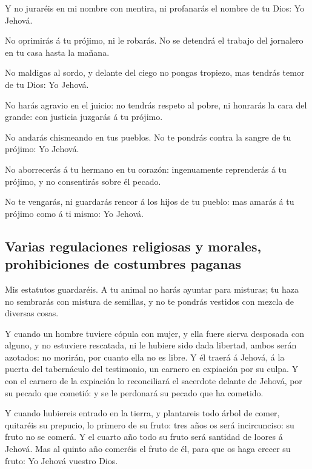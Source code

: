  Y no juraréis en mi nombre con mentira, ni profanarás el
nombre de tu Dios: Yo Jehová.

 No oprimirás á tu prójimo, ni le robarás. No se detendrá
el trabajo del jornalero en tu casa hasta la mañana.

 No maldigas al sordo, y delante del ciego no pongas
tropiezo, mas tendrás temor de tu Dios: Yo Jehová.

 No harás agravio en el juicio: no tendrás respeto al
pobre, ni honrarás la cara del grande: con justicia juzgarás á tu
prójimo.

 No andarás chismeando en tus pueblos. No te pondrás contra
la sangre de tu prójimo: Yo Jehová.

 No aborrecerás á tu hermano en tu corazón: ingenuamente
reprenderás á tu prójimo, y no consentirás sobre él pecado.

 No te vengarás, ni guardarás rencor á los hijos de tu
pueblo: mas amarás á tu prójimo como á ti mismo: Yo Jehová.

\hypertarget{varias-regulaciones-religiosas-y-morales-prohibiciones-de-costumbres-paganas}{%
\subsection{Varias regulaciones religiosas y morales, prohibiciones de
costumbres
paganas}\label{varias-regulaciones-religiosas-y-morales-prohibiciones-de-costumbres-paganas}}

 Mis estatutos guardaréis. A tu animal no harás ayuntar
para misturas; tu haza no sembrarás con mistura de semillas, y no te
pondrás vestidos con mezcla de diversas cosas.

 Y cuando un hombre tuviere cópula con mujer, y ella fuere
sierva desposada con alguno, y no estuviere rescatada, ni le hubiere
sido dada libertad, ambos serán azotados: no morirán, por cuanto ella no
es libre.  Y él traerá á Jehová, á la puerta del
tabernáculo del testimonio, un carnero en expiación por su culpa.
 Y con el carnero de la expiación lo reconciliará el
sacerdote delante de Jehová, por su pecado que cometió: y se le
perdonará su pecado que ha cometido.

 Y cuando hubiereis entrado en la tierra, y plantareis todo
árbol de comer, quitaréis su prepucio, lo primero de su fruto: tres años
os será incircunciso: su fruto no se comerá.  Y el cuarto
año todo su fruto será santidad de loores á Jehová.  Mas al
quinto año comeréis el fruto de él, para que os haga crecer su fruto: Yo
Jehová vuestro Dios.

